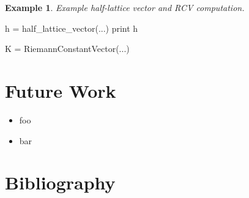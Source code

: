 \documentclass[12pt]{article}
\theoremstyle{definition}
\newtheorem{example}[theorem]{Example}
\begin{document}
\begin{example}
  {\it Example half-lattice vector and RCV computation.}

\begin{ipythoninput}
h = half_lattice_vector(...)
print h
\end{ipythoninput}
\begin{ipythonoutput}
[XXX]
\end{ipythonoutput}
\begin{ipythoninput}
K = RiemannConstantVector(...)
\end{ipythoninput}
\begin{ipythonoutput}
[XXX]
\end{ipythonoutput}
\end{example}



\section{Future Work}

\begin{itemize}
  \item foo
  \item bar
\end{itemize}

\section{Bibliography}




\end{document}

